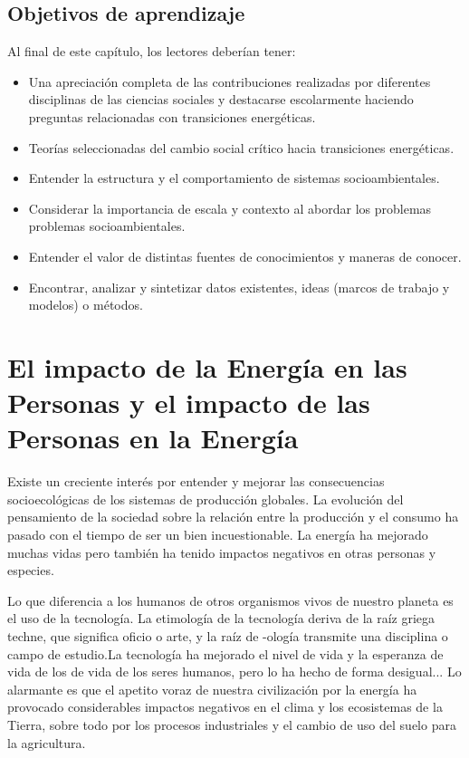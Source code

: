 \documentclass{article}
\begin{document}
\subsection{Objetivos de aprendizaje}
Al final de este capítulo, los lectores deberían tener: 
\begin{itemize}
\item Una apreciación completa de las contribuciones realizadas por diferentes disciplinas de las ciencias sociales y destacarse escolarmente haciendo preguntas relacionadas con transiciones energéticas. 
\item Teorías seleccionadas del cambio social crítico hacia transiciones energéticas.
\item Entender la estructura y el comportamiento de sistemas socioambientales.
\item Considerar la importancia de escala y contexto al abordar los problemas problemas socioambientales. 
\item Entender el valor de distintas fuentes de conocimientos y maneras de conocer.
\item Encontrar, analizar y sintetizar datos existentes, ideas (marcos de trabajo y modelos) o métodos.
\end{itemize}
\section{El impacto de la Energía en las Personas y el impacto de las Personas en la Energía}


Existe un creciente interés por entender y mejorar las consecuencias socioecológicas de los sistemas de producción globales. La evolución del pensamiento de la sociedad sobre la relación entre la producción y el consumo ha pasado con el tiempo de ser un bien incuestionable. La energía ha mejorado muchas vidas pero también ha tenido impactos negativos en otras personas y especies.

Lo que diferencia a los humanos de otros organismos vivos de nuestro planeta es el uso de la tecnología. La etimología de la tecnología deriva de la raíz griega techne, que significa oficio o arte, y la raíz de -ología transmite una disciplina o campo de estudio.La tecnología ha mejorado el nivel de vida y la esperanza de vida de los de vida de los seres humanos, pero lo ha hecho de forma desigual... Lo alarmante es que el apetito voraz de nuestra civilización por la energía ha provocado considerables impactos negativos en el clima y los ecosistemas de la Tierra, sobre todo por los procesos industriales y el cambio de uso del suelo para la agricultura.
\end{document}
